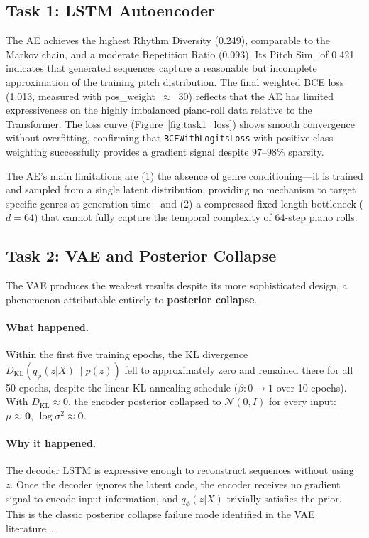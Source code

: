\documentclass[letterpaper]{article}
\newcommand{\Ncal}{\mathcal{N}}
\begin{document}
\subsection{Task 1: LSTM Autoencoder}

The AE achieves the highest Rhythm Diversity (0.249), comparable to the
Markov chain, and a moderate Repetition Ratio (0.093).  Its Pitch Sim.\ of
0.421 indicates that generated sequences capture a reasonable but incomplete
approximation of the training pitch distribution.  The final weighted BCE
loss (1.013, measured with pos\_weight~$\approx$~30) reflects that the AE
has limited expressiveness on the highly imbalanced piano-roll data relative
to the Transformer.  The loss curve (Figure~\ref{fig:task1_loss}) shows
smooth convergence without overfitting, confirming that
\texttt{BCEWithLogitsLoss} with positive class weighting successfully
provides a gradient signal despite 97--98\% sparsity.

The AE's main limitations are (1) the absence of genre conditioning---it is
trained and sampled from a single latent distribution, providing no
mechanism to target specific genres at generation time---and
(2) a compressed fixed-length bottleneck ($d = 64$) that cannot fully
capture the temporal complexity of 64-step piano rolls.

\subsection{Task 2: VAE and Posterior Collapse}
\label{sec:vae_collapse}

The VAE produces the weakest results despite its more sophisticated design,
a phenomenon attributable entirely to \textbf{posterior collapse}.

\paragraph{What happened.}
Within the first five training epochs, the KL divergence
$D_{\mathrm{KL}}(q_\phi(z|X)\|p(z))$ fell to approximately zero and
remained there for all 50 epochs, despite the linear KL annealing
schedule ($\beta: 0 \to 1$ over 10 epochs).  With
$D_{\mathrm{KL}} \approx 0$, the encoder posterior collapsed to
$\Ncal(0, I)$ for every input: $\mu \approx \mathbf{0}$,
$\log\sigma^2 \approx \mathbf{0}$.

\paragraph{Why it happened.}
The decoder LSTM is expressive enough to reconstruct sequences without
using~$z$.  Once the decoder ignores the latent code, the encoder
receives no gradient signal to encode input information, and
$q_\phi(z|X)$ trivially satisfies the prior.  This is the classic
posterior collapse failure mode identified in the VAE
literature~\cite{bowman2016vae_collapse}.
\end{document}
